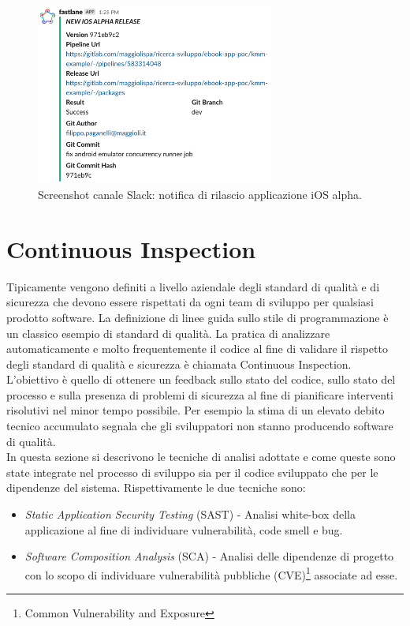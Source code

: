 \begin{figure}[H]
\centering
\includegraphics[width=0.7\textwidth]{img/Screenshot 2022-07-08 at 17.48.40.png}
\caption{Screenshot canale Slack: notifica di rilascio applicazione iOS alpha.}
\end{figure}

\section{Continuous Inspection}
Tipicamente vengono definiti a livello aziendale degli standard di qualità e di sicurezza che devono essere rispettati da ogni team di sviluppo per qualsiasi prodotto software. La definizione di linee guida sullo stile di programmazione è un classico esempio di standard di qualità. La pratica di analizzare automaticamente e molto frequentemente il codice al fine di validare il rispetto degli standard di qualità e sicurezza è chiamata Continuous Inspection.
L'obiettivo è quello di ottenere un feedback sullo stato del codice, sullo stato del processo e sulla presenza di problemi di sicurezza al fine di pianificare interventi risolutivi nel minor tempo possibile. Per esempio la stima di un elevato debito tecnico accumulato segnala che gli sviluppatori non stanno producendo software di qualità.\\
In questa sezione si descrivono le tecniche di analisi adottate e come queste sono state integrate nel processo di sviluppo sia per il codice sviluppato che per le dipendenze del sistema. Rispettivamente le due tecniche sono:
\begin{itemize}
    \item \textit{Static Application Security Testing} (SAST) - Analisi white-box della applicazione al fine di individuare vulnerabilità, code smell e bug.
    \item \textit{Software Composition Analysis} (SCA) - Analisi delle dipendenze di progetto con lo scopo di individuare vulnerabilità pubbliche (CVE)\footnote{Common Vulnerability and Exposure} associate ad esse.
\end{itemize}


